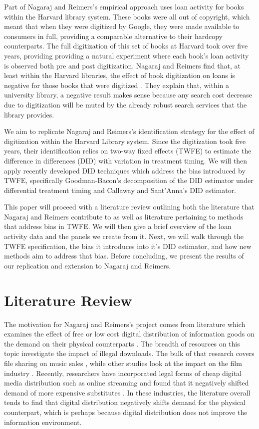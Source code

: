 \documentclass{article}
\begin{document}
Part of Nagaraj and Reimers's empirical approach uses loan activity for books within the Harvard library system. These books were all out of copyright, which meant that when they were digitized by Google, they were made available to consumers in full, providing a comparable alternative to their hardcopy counterparts. The full digitization of this set of books at Harvard took over five years, providing providing a natural experiment where each book's loan activity is observed both pre and post digitization. Nagaraj and Reimers find that, at least within the Harvard libraries, the effect of book digitization on loans is negative for those books that were digitized \cite{nagaraj2021digitization}. They explain that, within a university library, a negative result makes sense because any search cost decrease due to digitization will be muted by the already robust search services that the library provides. 

We aim to replicate Nagaraj and Reimers's identification strategy for the effect of digitization within the Harvard Library system. Since the digitization took five years, their identification relies on two-way fixed effects (TWFE) to estimate the difference in differences (DID) with variation in treatment timing. We will then apply recently developed DID techniques which address the bias introduced by TWFE, specifically Goodman-Bacon's decomposition of the DID estimator under differential treatment timing and Callaway and Sant'Anna's DID estimator. 

This paper will proceed with a literature review outlining both the literature that Nagaraj and Reimers contribute to as well as literature pertaining to methods that address bias in TWFE. We will then give a brief overview of the loan activity data and the panels we create from it. Next, we will walk through the TWFE specification, the bias it introduces into it's DID estimator, and how new methods aim to address that bias. Before concluding, we present the results of our replication and extension to Nagaraj and Reimers. 

\section{Literature Review}
The motivation for Nagaraj and Reimers's project comes from literature which examines the effect of free or low cost digital distribution of information goods on the demand on their physical counterparts \cite{smith2016internet}. The breadth of resources on this topic investigate the impact of illegal downloads. The bulk of that research covers file sharing on music sales \cite{bounie2006piracy}, while other studies look at the impact on the film industry \cite{rob2007piracy}. Recently, researchers have incorporated legal forms of cheap digital media distribution such as online streaming and found that it negatively shifted demand of more expensive substitutes \cite{aguiar2018streaming}. In these industries, the literature overall tends to find that digital distribution negatively shifts demand for the physical counterpart, which is perhaps because digital distribution does not improve the information environment.
\end{document}
